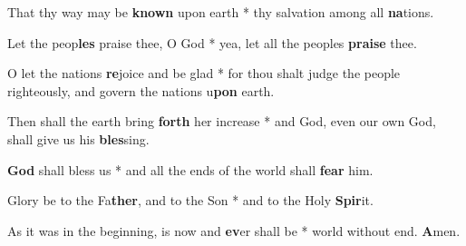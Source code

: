 \begin{multicols}{2}
	That thy way may be \textbf{known} upon earth * thy salvation among all \textbf{na}tions.
	
	Let the peop\textbf{les} praise thee, O God * yea, let all the peoples \textbf{praise} thee.
	
	O let the nations \textbf{re}joice and be glad * for thou shalt judge the people righteously, and govern the nations u\textbf{pon} earth.
	
	Then shall the earth bring \textbf{forth} her increase * and God, even our own God, shall give us his \textbf{bles}sing.
	
	\textbf{God} shall bless us * and all the ends of the world shall \textbf{fear} him.
	
	Glory be to the Fa\textbf{ther}, and to the Son * and to the Holy \textbf{Spir}it.
	
	As it was in the beginning, is now and \textbf{ev}er shall be * world without end. \textbf{A}men.
\end{multicols}
